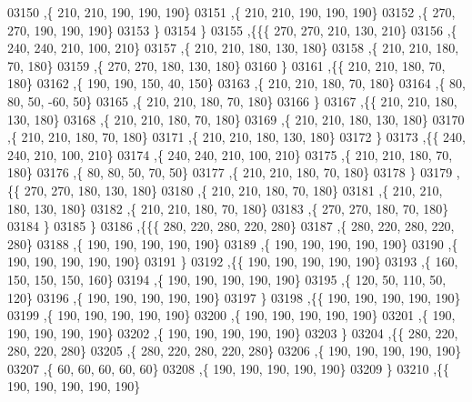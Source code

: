 \begin{DoxyCode}
03150     ,\{   210,   210,   190,   190,   190\}
03151     ,\{   210,   210,   190,   190,   190\}
03152     ,\{   270,   270,   190,   190,   190\}
03153     \}
03154    \}
03155   ,\{\{\{   270,   270,   210,   130,   210\}
03156     ,\{   240,   240,   210,   100,   210\}
03157     ,\{   210,   210,   180,   130,   180\}
03158     ,\{   210,   210,   180,    70,   180\}
03159     ,\{   270,   270,   180,   130,   180\}
03160     \}
03161    ,\{\{   210,   210,   180,    70,   180\}
03162     ,\{   190,   190,   150,    40,   150\}
03163     ,\{   210,   210,   180,    70,   180\}
03164     ,\{    80,    80,    50,   -60,    50\}
03165     ,\{   210,   210,   180,    70,   180\}
03166     \}
03167    ,\{\{   210,   210,   180,   130,   180\}
03168     ,\{   210,   210,   180,    70,   180\}
03169     ,\{   210,   210,   180,   130,   180\}
03170     ,\{   210,   210,   180,    70,   180\}
03171     ,\{   210,   210,   180,   130,   180\}
03172     \}
03173    ,\{\{   240,   240,   210,   100,   210\}
03174     ,\{   240,   240,   210,   100,   210\}
03175     ,\{   210,   210,   180,    70,   180\}
03176     ,\{    80,    80,    50,    70,    50\}
03177     ,\{   210,   210,   180,    70,   180\}
03178     \}
03179    ,\{\{   270,   270,   180,   130,   180\}
03180     ,\{   210,   210,   180,    70,   180\}
03181     ,\{   210,   210,   180,   130,   180\}
03182     ,\{   210,   210,   180,    70,   180\}
03183     ,\{   270,   270,   180,    70,   180\}
03184     \}
03185    \}
03186   ,\{\{\{   280,   220,   280,   220,   280\}
03187     ,\{   280,   220,   280,   220,   280\}
03188     ,\{   190,   190,   190,   190,   190\}
03189     ,\{   190,   190,   190,   190,   190\}
03190     ,\{   190,   190,   190,   190,   190\}
03191     \}
03192    ,\{\{   190,   190,   190,   190,   190\}
03193     ,\{   160,   150,   150,   150,   160\}
03194     ,\{   190,   190,   190,   190,   190\}
03195     ,\{   120,    50,   110,    50,   120\}
03196     ,\{   190,   190,   190,   190,   190\}
03197     \}
03198    ,\{\{   190,   190,   190,   190,   190\}
03199     ,\{   190,   190,   190,   190,   190\}
03200     ,\{   190,   190,   190,   190,   190\}
03201     ,\{   190,   190,   190,   190,   190\}
03202     ,\{   190,   190,   190,   190,   190\}
03203     \}
03204    ,\{\{   280,   220,   280,   220,   280\}
03205     ,\{   280,   220,   280,   220,   280\}
03206     ,\{   190,   190,   190,   190,   190\}
03207     ,\{    60,    60,    60,    60,    60\}
03208     ,\{   190,   190,   190,   190,   190\}
03209     \}
03210    ,\{\{   190,   190,   190,   190,   190\}

\end{DoxyCode}
